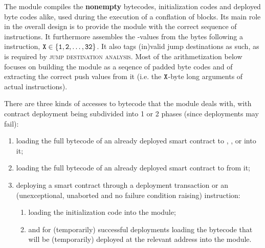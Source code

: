 The \romMod{} module compiles the \textbf{nonempty} bytecodes, initialization codes and deployed byte codes alike, used during the execution of a conflation of blocks.
Its main role in the overall design is to provide the \hubMod{} module with the correct sequence of instructions.
It furthermore assembles the -values from the bytes following a  instruction, $\texttt{X} \in \{ \texttt{1}, \texttt{2}, \dots, \texttt{32} \}$.
It also tags (in)valid jump destinations as such, as is required by \textsc{jump destination analysis}.
Most of the arithmetization below focuses on building the \romMod{} module as a seqence of padded byte codes and of extracting the correct push values from it (i.e. the $\texttt{X}$-byte long arguments of actual  instructions).

There are three kinds of accesses to bytecode that the \romMod{} module  deals with, with contract deployment being subdivided into 1 or 2 phases (since deployments may fail):
\begin{enumerate}
    \item loading the full bytecode of an already deployed smart contract to , ,  or  into it;
    \item loading the full bytecode of an already deployed smart contract to  from it;
    \item deploying a smart contract through a deployment transaction or an (unexceptional, unaborted and no failure condition raising)  instruction:
        \begin{enumerate}
            \item loading the initialization code into the \romMod{} module;
            \item and for (temporarily) successful deployments loading the bytecode that will be (temporarily) deployed at the relevant address into the \romMod{} module.
        \end{enumerate}
\end{enumerate}
